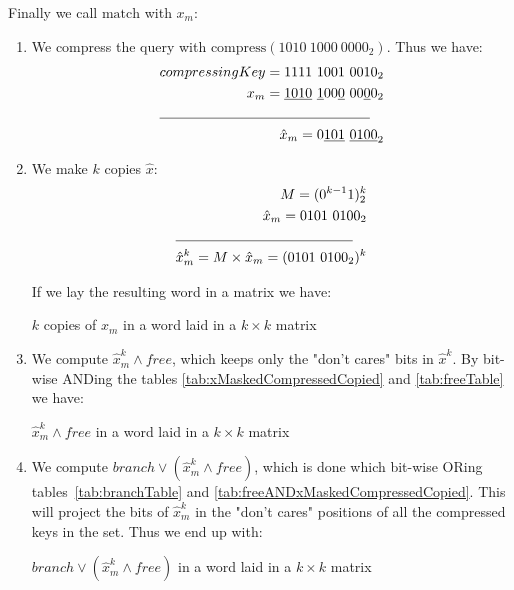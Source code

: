 \begin{enumerate}
    Finally we call $\text{match}$ with $x_m$:
    \begin{enumerate}
        \item
        We compress the query with $\text{compress}(1010\ 1000\ 0000_2)$. Thus we have:
        \begin{align*}
            compressingKey = 1111\ 1001\ 0010_2\\
            x_m = \underline{1010}\ \underline{1}00\underline{0}\ 00\underline{0}0_2\\
            \cline{1-2}
            \hat x_m = 0\underline{101}\ \underline{0100}_2
        \end{align*}
        \item
        We make $k$ copies $\hat x$:
        \begin{align*}
            M = (0^{k-1}1)^k_2\\
            \hat x_m = 0101\ 0100_2\\
            \cline{1-2}
            \hat x^k_m = M \times \hat x_m = (0101\ 0100_2)^k\\
        \end{align*}
        
        If we lay the resulting word in a matrix we have:
        \begin{table}[H]
        \centering
        
        \caption{$k$ copies of $\hat x_m$ in a word laid in a $k \times k$ matrix}
        \label{tab:xMaskedCompressedCopied}
        \end{table}
        
        \item
        
        We compute $\hat x^k_m \wedge free$, which keeps only the "don't cares" bits in $\hat x^k$. By bit-wise ANDing the tables \ref{tab:xMaskedCompressedCopied} and \ref{tab:freeTable} we have:
        \begin{table}[H]
        \centering
        
        \caption{$\hat x^k_m \wedge free$ in a word laid in a $k \times k$ matrix}
        \label{tab:freeANDxMaskedCompressedCopied}
        \end{table}
        
        \item
        We compute $branch \vee (\hat x^k_m \wedge free)$, which is done which bit-wise ORing tables~\ref{tab:branchTable} and \ref{tab:freeANDxMaskedCompressedCopied}. This will project the bits of $\hat x^k_m$ in the "don't cares" positions of all the compressed keys in the set. Thus we end up with:
        \begin{table}[H]
        \centering
        
        \caption{$branch \vee (\hat x^k_m \wedge free)$ in a word laid in a $k \times k$ matrix}
        \label{tab:branchORfreeANDxMCopied}
        \end{table}
        

\end{enumerate}
\end{enumerate}
